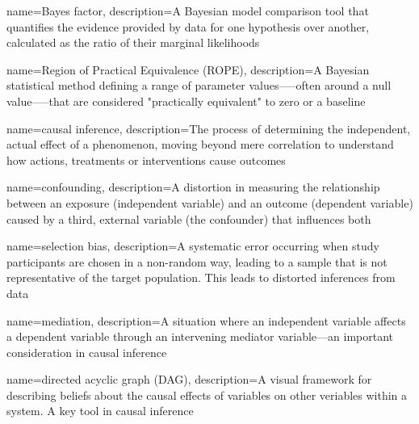 {
    name={Bayes factor},
    description={A Bayesian model comparison tool that quantifies the evidence provided by data for one hypothesis over another, calculated as the ratio of their marginal likelihoods}
}

{
    name={Region of Practical Equivalence (ROPE)},
    description={A Bayesian statistical method defining a range of parameter values—--often around a null value—--that are considered "practically equivalent" to zero or a baseline}
}

{
    name={causal inference},
    description={The process of determining the independent, actual effect of a phenomenon, moving beyond mere correlation to understand how actions, treatments or interventions cause outcomes}
}

{
    name={confounding},
    description={A distortion in measuring the relationship between an exposure (independent variable) and an outcome (dependent variable) caused by a third, external variable (the confounder) that influences both}
}

{
    name={selection bias},
    description={A systematic error occurring when study participants are chosen in a non-random way, leading to a sample that is not representative of the target population.  This leads to distorted inferences from data}
}

{
    name={mediation},
    description={A situation where an independent variable affects a dependent variable through an intervening mediator variable---an important consideration in causal inference}
}

{
    name={directed acyclic graph (DAG)},
    description={A visual framework for describing beliefs about the causal effects of variables on other veriables within a system.  A key tool in causal inference}
}

\glsaddall

\lstset{
  breaklines=true
}

\frontmatter

